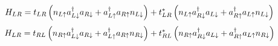 \begin{equation}
  H_{LR} = t_{LR} \left(n_{L\uparrow}a^{\dagger}_{L\downarrow}a_{R\downarrow}+
                   a^{\dagger}_{L\uparrow}a_{R\uparrow}n_{L\downarrow}\right)+
           t^*_{LR} \left(n_{L\uparrow}a^{\dagger}_{R\downarrow}a_{L\downarrow}+
                   a^{\dagger}_{R\uparrow}a_{L\uparrow}n_{L\downarrow}\right)
\end{equation}
\begin{equation}
  H_{LR} = t_{RL} \left(n_{R\uparrow}a^{\dagger}_{L\downarrow}a_{R\downarrow}+
                   a^{\dagger}_{L\uparrow}a_{R\uparrow}n_{R\downarrow}\right)+
           t^*_{RL} \left(n_{R\uparrow}a^{\dagger}_{R\downarrow}a_{L\downarrow}+
                   a^{\dagger}_{R\uparrow}a_{L\uparrow}n_{R\downarrow}\right)
\end{equation}

